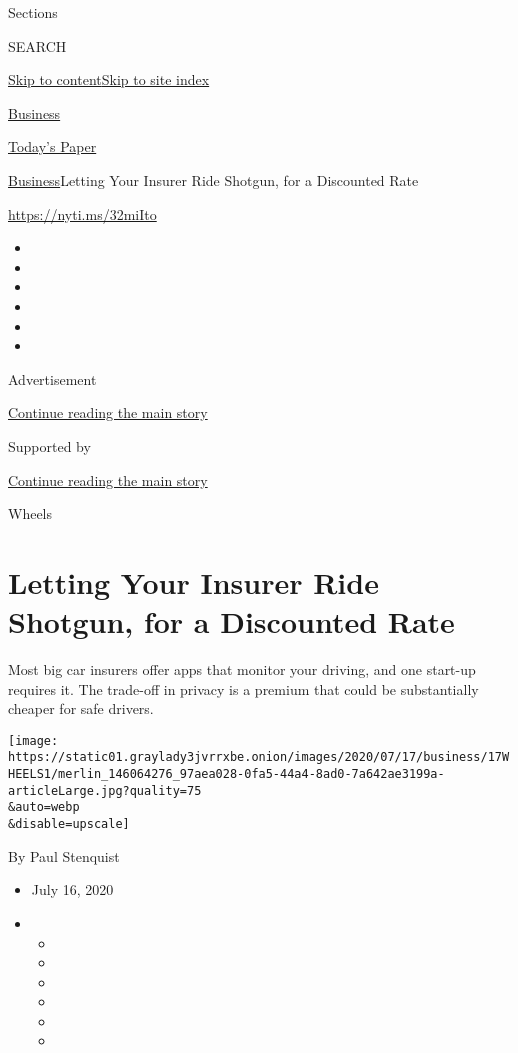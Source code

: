 Sections

SEARCH

\protect\hyperlink{site-content}{Skip to
content}\protect\hyperlink{site-index}{Skip to site index}

\href{https://www.nytimes3xbfgragh.onion/section/business}{Business}

\href{https://myaccount.nytimes3xbfgragh.onion/auth/login?response_type=cookie\&client_id=vi}{}

\href{https://www.nytimes3xbfgragh.onion/section/todayspaper}{Today's
Paper}

\href{/section/business}{Business}\textbar{}Letting Your Insurer Ride
Shotgun, for a Discounted Rate

\url{https://nyti.ms/32miIto}

\begin{itemize}
\item
\item
\item
\item
\item
\item
\end{itemize}

Advertisement

\protect\hyperlink{after-top}{Continue reading the main story}

Supported by

\protect\hyperlink{after-sponsor}{Continue reading the main story}

Wheels

\hypertarget{letting-your-insurer-ride-shotgun-for-a-discounted-rate}{%
\section{Letting Your Insurer Ride Shotgun, for a Discounted
Rate}\label{letting-your-insurer-ride-shotgun-for-a-discounted-rate}}

Most big car insurers offer apps that monitor your driving, and one
start-up requires it. The trade-off in privacy is a premium that could
be substantially cheaper for safe drivers.

\texttt{[image: https://static01.graylady3jvrrxbe.onion/images/2020/07/17/business/17WHEELS1/merlin\_146064276\_97aea028-0fa5-44a4-8ad0-7a642ae3199a-articleLarge.jpg?quality=75\\\&auto=webp\\\&disable=upscale]}

By Paul Stenquist

\begin{itemize}
\item
  July 16, 2020
\item
  \begin{itemize}
  \item
  \item
  \item
  \item
  \item
  \item
  \end{itemize}
\end{itemize}

